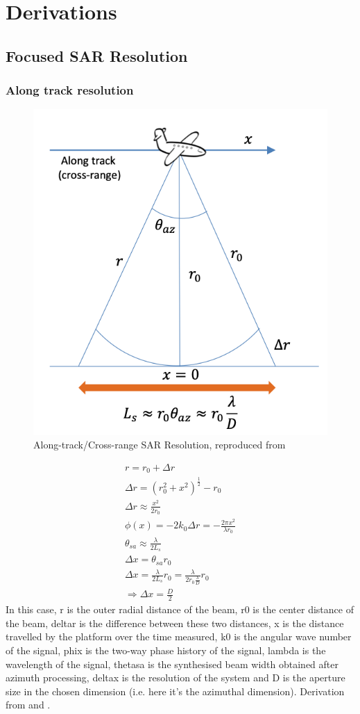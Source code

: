 \appendix
\chapter{Derivations}
\label{appen:derivations}
\section{Focused SAR Resolution}
\subsection{Along track resolution}
\begin{figure}
\centering
\includegraphics[width=0.5\linewidth]{../figures/sar_along_track_res}
\caption{Along-track/Cross-range SAR Resolution, reproduced from \cite{watsonEE40136RadarSystems2020}}
\label{fig:sar_along_track}
\end{figure}
\begin{gather}
	r = r_0 + \Delta r \\
	\Delta r = (r_0^2 + x^2) ^ \frac{1}{2} - r_0\\
	\Delta r \approx \frac{x^2}{2r_0}\\
	\phi(x) = -2k_0 \Delta r = -\frac{2\pi x^2}{\lambda r_0}\\
	\theta _{sa} \approx \frac{\lambda}{2L_s}\\
	\Delta x = \theta _{sa}r_0\\
	\Delta x = \frac{\lambda}{2L_s}r_0 = \frac{\lambda}{2r_0\frac{\lambda}{D}} r_0\\
	\Rightarrow \Delta x = \frac{D}{2}
\end{gather}
In this case, \gls{r} is the outer radial distance of the beam, \gls{r0} is the center distance of the beam, \gls{deltar} is the difference between these two distances, \gls{x} is the distance travelled by the platform over the time measured, \gls{k0} is the angular wave number of the signal, \gls{phix} is the two-way phase history of the signal, \gls{lambda} is the wavelength of the signal, \gls{thetasa} is the synthesised beam width obtained after azimuth processing, \gls{deltax} is the resolution of the system and \gls{D} is the aperture size in the chosen dimension (i.e. here it's the azimuthal dimension). Derivation from \cite{richardsRemoteSensingImaging2009} and \cite{watsonEE40136RadarSystems2020}.
